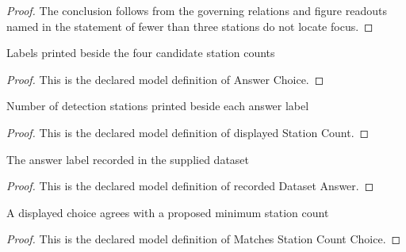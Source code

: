 \begin{proof}
  The conclusion follows from the governing relations and figure readouts named in the statement of fewer than three stations do not locate focus.
\end{proof}
\begin{definition}
  \label{def:physics:phyx-mini-0239:phyxminiproblems-problemphyxmini0239-answerchoice}
  Labels printed beside the four candidate station counts
\end{definition}
\begin{proof}
  This is the declared model definition of Answer Choice.
\end{proof}
\begin{definition}
  \label{def:physics:phyx-mini-0239:phyxminiproblems-problemphyxmini0239-displayedstationcount}
  Number of detection stations printed beside each answer label
\end{definition}
\begin{proof}
  This is the declared model definition of displayed Station Count.
\end{proof}
\begin{definition}
  \label{def:physics:phyx-mini-0239:phyxminiproblems-problemphyxmini0239-recordeddatasetanswer}
  The answer label recorded in the supplied dataset
\end{definition}
\begin{proof}
  This is the declared model definition of recorded Dataset Answer.
\end{proof}
\begin{definition}
  \label{def:physics:phyx-mini-0239:phyxminiproblems-problemphyxmini0239-matchesstationcountchoice}
  A displayed choice agrees with a proposed minimum station count
\end{definition}
\begin{proof}
  This is the declared model definition of Matches Station Count Choice.
\end{proof}
